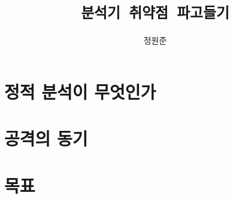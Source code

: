 \documentclass{simplesnt}
\title{\texttt{분석기 취약점 파고들기}}
\author{정원준}
\begin{document}
\maketitle

\section{정적 분석이 무엇인가}










\section{공격의 동기}
\section{목표}
\end{document}
